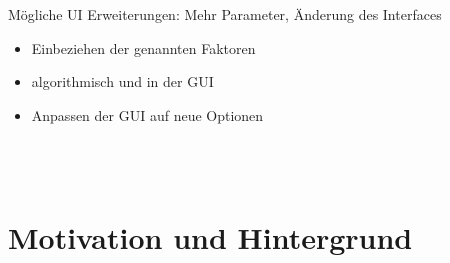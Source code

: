 \documentclass[aspectratio=169,xcolor=dvipsnames, t]{beamer}
\begin{document}
\begin{frame}
{\begin{minipage}[t][3.8cm][b]{0.48\linewidth}
{\begin{block}{Mögliche UI Erweiterungen: Mehr Parameter, Änderung des Interfaces}
\begin{itemize}
						\item<10-> Einbeziehen der genannten Faktoren
						\item<11-> algorithmisch und in der GUI
						\item<12-> Anpassen der GUI auf neue Optionen
					\end{itemize}
				\end{block}
			\textcolor{white}{a}\\
			\textcolor{white}{a}}
			\end{minipage}}
	\end{frame}
	
	
	\section{Motivation und Hintergrund}	
\end{document}
